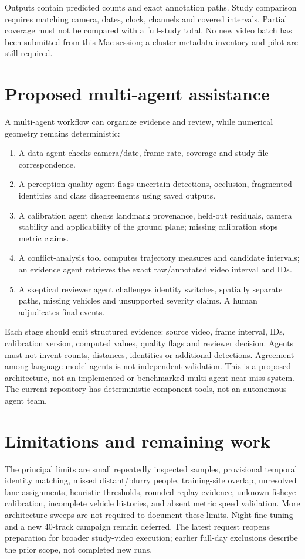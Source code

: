 \documentclass[11pt,letterpaper]{article}
\begin{document}
Outputs contain predicted counts and exact annotation paths. Study comparison requires matching camera, dates, clock, channels and covered intervals. Partial coverage must not be compared with a full-study total. No new video batch has been submitted from this Mac session; a cluster metadata inventory and pilot are still required.

\section{Proposed multi-agent assistance}
A multi-agent workflow can organize evidence and review, while numerical geometry remains deterministic:
\begin{enumerate}
\item A data agent checks camera/date, frame rate, coverage and study-file correspondence.
\item A perception-quality agent flags uncertain detections, occlusion, fragmented identities and class disagreements using saved outputs.
\item A calibration agent checks landmark provenance, held-out residuals, camera stability and applicability of the ground plane; missing calibration stops metric claims.
\item A conflict-analysis tool computes trajectory measures and candidate intervals; an evidence agent retrieves the exact raw/annotated video interval and IDs.
\item A skeptical reviewer agent challenges identity switches, spatially separate paths, missing vehicles and unsupported severity claims. A human adjudicates final events.
\end{enumerate}
Each stage should emit structured evidence: source video, frame interval, IDs, calibration version, computed values, quality flags and reviewer decision. Agents must not invent counts, distances, identities or additional detections. Agreement among language-model agents is not independent validation. This is a proposed architecture, not an implemented or benchmarked multi-agent near-miss system. The current repository has deterministic component tools, not an autonomous agent team.

\section{Limitations and remaining work}
The principal limits are small repeatedly inspected samples, provisional temporal identity matching, missed distant/blurry people, training-site overlap, unresolved lane assignments, heuristic thresholds, rounded replay evidence, unknown fisheye calibration, incomplete vehicle histories, and absent metric speed validation. More architecture sweeps are not required to document these limits. Night fine-tuning and a new 40-track campaign remain deferred. The latest request reopens preparation for broader study-video execution; earlier full-day exclusions describe the prior scope, not completed new runs.
\end{document}
